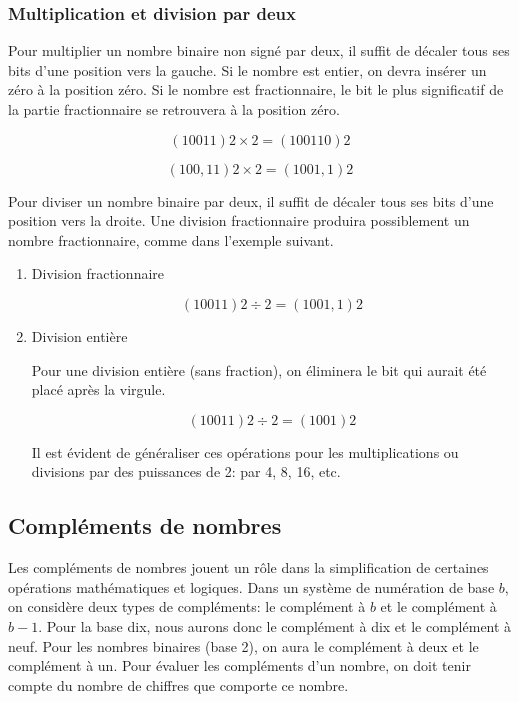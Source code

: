\documentclass[11pt]{article}
\begin{document}
\subsubsection{Multiplication et division par deux}
\label{sec:org17c865d}

Pour multiplier un nombre binaire non signé par deux, il suffit de
décaler tous ses bits d'une position vers la gauche. Si le nombre est
entier, on devra insérer un zéro à la position zéro. Si le nombre est
fractionnaire, le bit le plus significatif de la partie fractionnaire se
retrouvera à la position zéro.

$$ (10011)2 \times 2 = (100110)2 $$

$$ (100,11)2 \times 2 = (1001,1)2 $$

Pour diviser un nombre binaire par deux, il suffit de décaler tous ses
bits d'une position vers la droite. Une division fractionnaire
produira possiblement un nombre fractionnaire, comme dans l'exemple
suivant.

\begin{enumerate}
\item Division fractionnaire
\label{sec:org0585d47}

$$ (10011)2 \div 2 = (1001,1)2 $$

\item Division entière
\label{sec:orgfa7e0de}

Pour une division entière (sans fraction), on éliminera le bit qui
aurait été placé après la virgule.

$$ (10011)2 \div 2 = (1001)2 $$

Il est évident de généraliser ces opérations pour les multiplications
ou divisions par des puissances de 2: par 4, 8, 16, etc.
\end{enumerate}

\subsection{Compléments de nombres}
\label{sec:org5bf108b}

Les compléments de nombres jouent un rôle dans la simplification de
certaines opérations mathématiques et logiques. Dans un système de
numération de base \(b\), on considère deux types de compléments: le
complément à \(b\) et le complément à \(b-1\). Pour la base dix, nous
aurons donc le complément à dix et le complément à neuf. Pour les
nombres binaires (base 2), on aura le complément à deux et le
complément à un.  Pour évaluer les compléments d'un nombre, on doit
tenir compte du nombre de chiffres que comporte ce nombre.
\end{document}
